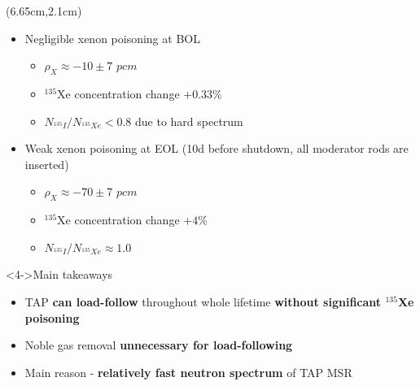 \begin{frame}
\begin{textblock*}{12.5cm}
\begin{columns}
	\column[t]{5.5cm}
	\begin{textblock*}{6cm}(6.65cm,2.1cm) %
		\fontsize{7}{9}\selectfont
		\begin{itemize}
		\item<1-> Negligible xenon poisoning at BOL
			\begin{itemize}
				\item $\rho_X\approx-10\pm7$ $pcm$
				\item $^{135}$Xe concentration change $+0.33$\%
				\item $N_{^{135}I}/N_{^{135}Xe}<0.8$ due to hard spectrum
			\end{itemize} 
			\item<2-> Weak xenon poisoning at EOL (10d before shutdown, all 
			moderator rods are inserted)
			\begin{itemize}
				\item $\rho_X\approx-70\pm7$ $pcm$
				\item $^{135}$Xe concentration change $+4$\%
				\item<3-> $N_{^{135}I}/N_{^{135}Xe}\approx1.0$
			\end{itemize}
		\end{itemize}
				\vspace{+5mm}
		\begin{block}<4->{\qquad Main takeaways}
			\begin{itemize}
				\item TAP \textbf{can load-follow} throughout whole
			lifetime \textbf{without significant $^{135}$Xe poisoning}
				\item Noble gas removal \textbf{unnecessary for load-following}
				\item Main reason - \textbf{relatively fast neutron spectrum} 
				of TAP MSR
			\end{itemize}
		
	\end{block}
	\end{textblock*}
\end{columns}
\end{textblock*}
\end{frame}



